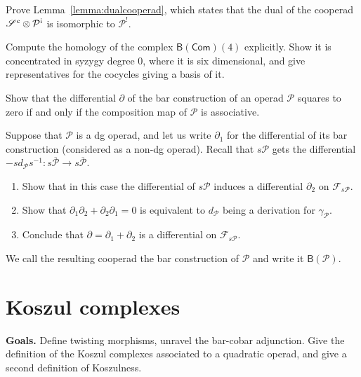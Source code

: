 \documentclass[fleqn, a4paper, twoside]{article}
\newcommand{\antishriek}{\text{\raisebox{\depth}{\textexclamdown}}}
\newcommand{\0}{\langle 0\rangle}
\newcommand{\FF}{\mathcal{F}}
\newcommand{\B}[1]{\mathsf{B}(#1)}
\newenvironment{tenumerate}{
 \begin{enumerate}
  \setlength{\itemsep}{0pt}
  \setlength{\parskip}{0pt}
}{\end{enumerate}}
\DeclareRobustCommand{\[}{\begin{equation}}%
\DeclareRobustCommand{\]}{\end{equation}}%
\theoremstyle{mytheorem}
\theoremstyle{introthm}
\theoremstyle{mydefinition}
\theoremstyle{mydefinition2}
\theoremstyle{plain} %
\newcommand{\Com}{\mathsf{Com}}
\newcommand{\?}{\,?\,}
\newcommand{\PP}{{\mathcal{P}}}
\theoremstyle{mytheorem}
\theoremstyle{plain} %
\newcommand\blankpage{%
    \null
    \thispagestyle{empty}%
    \newpage}
\begin{document}
\begin{question}\label{ex:dualcooperad}
Prove Lemma~\ref{lemma:dualcooperad}, which states
that the dual of the cooperad  $\sus^c\otimes \PP^{\antishriek}$
is isomorphic to $\PP^!$.
\end{question} 

\begin{question}\label{ex:barcom}
Compute the homology of the complex $\B{\Com}(4)$ explicitly.
Show it is concentrated in syzygy degree $0$, where it is
six dimensional, and give representatives for the 
cocycles giving a basis of it.
\end{question}

\begin{question}\label{ex:zerosquare}
Show that the differential $\partial$ of the bar construction of
an operad $\PP$ squares to zero if and only if the composition
map of $\PP$ is associative. 
\end{question}

\begin{question}\label{ex:dgbar} Suppose that $\PP$ is a dg
operad, and let us write $\partial_1$ for the differential of its
bar construction (considered as a non-dg operad). Recall
that $s\PP$ gets the differential $-s d_\PP s^{-1}: 
s\overline{\PP}\longrightarrow s\overline{\PP}$.

\begin{tenumerate}
\item Show that in this case the differential
of $s\PP$ induces a differential $\partial_2$ on $\FF_{s\PP}$. 
\item Show that $\partial_1\partial_2 + \partial_2\partial_1=0$
is equivalent to $d_\PP$ being a derivation for $\gamma_\PP$.
\item
Conclude that $\partial = \partial_1 + \partial_2$ is a differential
on $\FF_{s\PP}$. 
\end{tenumerate}
We call the resulting cooperad the bar construction of
$\PP$ and write it $\B{\PP}$.
\end{question}


 
\afterpage{\blankpage}
\newpage
\section{Koszul complexes}

\textbf{Goals.} Define twisting morphisms, unravel the
bar-cobar adjunction. Give the definition of the
Koszul complexes associated to a quadratic operad,
and give a second definition of Koszulness.
\end{document}
